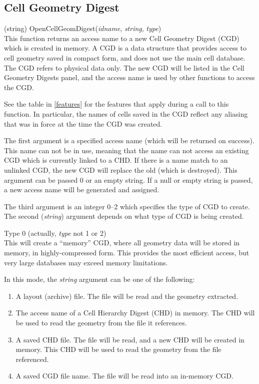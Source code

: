 \subsection{Cell Geometry Digest}

\begin{description}
\item{(string) \vt OpenCellGeomDigest({\it idname\/}, {\it string\/},
  {\it type\/})}\\
This function returns an access name to a new Cell Geometry Digest
(CGD) which is created in memory.  A CGD is a data structure that
provides access to cell geometry saved in compact form, and does not
use the main cell database.  The CGD refers to physical data only. 
The new CGD will be listed in the {\cb Cell Geometry Digests} panel,
and the access name is used by other functions to access the CGD.

See the table in \ref{features} for the features that apply during a
call to this function.  In particular, the names of cells saved in the
CGD reflect any aliasing that was in force at the time the CGD was
created.

The first argument is a specified access name (which will be returned
on success).  This name can not be in use, meaning that the name can
not access an existing CGD which is currently linked to a CHD.  If
there is a name match to an unlinked CGD, the new CGD will replace the
old (which is destroyed).  This argument can be passed 0 or an empty
string.  If a null or empty string is passed, a new access name will
be generated and assigned.

The third argument is an integer 0--2 which specifies the type of CGD
to create.  The second ({\it string\/}) argument depends on what type
of CGD is being created.

\begin{description}
\item{Type 0 (actually, {\it type} not 1 or 2)}\\
This will create a ``memory'' CGD, where all geometry data will be
stored in memory, in highly-compressed form.  This provides the most
efficient access, but very large databases may exceed memory
limitations.

In this mode, the {\it string} argument can be one of the following:
\begin{enumerate}
\item{A layout (archive) file.  The file will be read and the
geometry extracted.}
\item{The access name of a Cell Hierarchy Digest (CHD) in memory.
The CHD will be used to read the geometry from the file it
references.}
\item{A saved CHD file.  The file will be read, and a new CHD will
be created in memory.  This CHD will be used to read the geometry
from the file referenced.}
\item{A saved CGD file name.  The file will be read into an
in-memory CGD.}
\end{enumerate}


\end{description}
\end{description}
